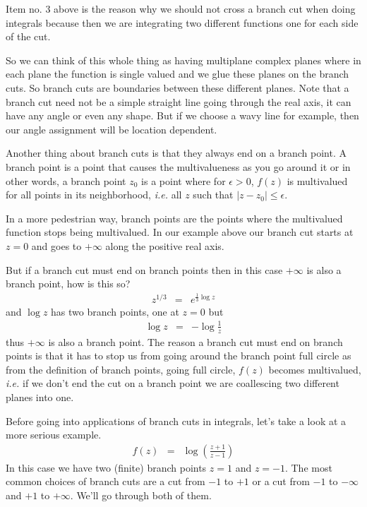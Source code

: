 \documentclass[aps,preprint,preprintnumbers,nofootinbib,showpacs,prd]{revtex4-1}
\newcommand{\ie}{{\it i.e.} }
\newcommand{\nbea}{\begin{eqnarray*}}
\newcommand{\neea}{\end{eqnarray*}}
\begin{document}
Item no. 3 above is the reason why we should not cross a branch cut when doing integrals because then we are integrating two different functions one for each side of the cut.

So we can think of this whole thing as having multiplane complex planes where in each plane the function is single valued and  we glue these planes on the branch cuts. So branch cuts are boundaries between these different planes. Note that a branch cut need not be a simple straight line going through the real axis, it can have any angle or even any shape. But if we choose a wavy line for example, then our angle assignment will be location dependent.

Another thing about branch cuts is that they always end on a branch point. A branch point is a point that causes the multivalueness as you go around it or in other words, a branch point $z_0$ is a point where for $\epsilon > 0$, $f(z)$ is multivalued for all points in its neighborhood, \ie all $z$ such that $|z - z_0| \le \epsilon$.

In a more pedestrian way, branch points are the points where the multivalued function stops being multivalued. In our example above  our branch cut starts at $z = 0$ and goes to $+\infty$ along the positive real axis.

But if a branch cut must end on branch points then in this case $+\infty$ is also a branch point, how is this so? 
%
\nbea
z^{1/3} & = & e^{\tfrac{1}{3} \log z}
\neea
%
and $\log z$ has two branch points, one at $z = 0$ but
%
\nbea
\log z & = & - \log \frac{1}{z}
\neea
%
thus $+\infty$ is also a branch point. The reason a branch cut must end on branch points is that it has to stop us from going around the branch point full circle as from the definition of branch points, going full circle, $f(z)$ becomes multivalued, \ie if we don't end the cut on a branch point we are coallescing two different planes into one.

Before going into applications of branch cuts in integrals, let's take a look at a more serious example.
%
\nbea
f(z) & = & \log \left ( \frac{z+1}{z-1} \right )
\neea
%
In this case we have two (finite) branch points $z = 1$ and $z = -1$. The most common choices of branch cuts are a cut from $-1$ to $+1$ or a cut from $-1$ to $-\infty$ and $+1$ to $+\infty$. We'll go through both of them.
\end{document}
